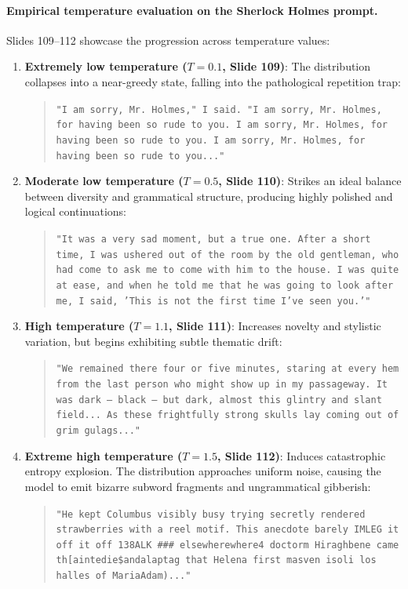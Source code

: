 \documentclass[../../main.tex]{subfiles}
\begin{document}
\paragraph{Empirical temperature evaluation on the Sherlock Holmes prompt.}
Slides 109--112 showcase the progression across temperature values:
\begin{enumerate}
    \item \textbf{Extremely low temperature ($T = 0.1$, Slide 109)}: The distribution collapses into a near-greedy state, falling into the pathological repetition trap:
    \begin{quote}
    \texttt{"I am sorry, Mr. Holmes," I said. "I am sorry, Mr. Holmes, for having been so rude to you. I am sorry, Mr. Holmes, for having been so rude to you. I am sorry, Mr. Holmes, for having been so rude to you..."}
    \end{quote}
    \item \textbf{Moderate low temperature ($T = 0.5$, Slide 110)}: Strikes an ideal balance between diversity and grammatical structure, producing highly polished and logical continuations:
    \begin{quote}
    \texttt{"It was a very sad moment, but a true one. After a short time, I was ushered out of the room by the old gentleman, who had come to ask me to come with him to the house. I was quite at ease, and when he told me that he was going to look after me, I said, 'This is not the first time I've seen you.'"}
    \end{quote}
    \item \textbf{High temperature ($T = 1.1$, Slide 111)}: Increases novelty and stylistic variation, but begins exhibiting subtle thematic drift:
    \begin{quote}
    \texttt{"We remained there four or five minutes, staring at every hem from the last person who might show up in my passageway. It was dark --- black --- but dark, almost this glintry and slant field... As these frightfully strong skulls lay coming out of grim gulags..."}
    \end{quote}
    \item \textbf{Extreme high temperature ($T = 1.5$, Slide 112)}: Induces catastrophic entropy explosion. The distribution approaches uniform noise, causing the model to emit bizarre subword fragments and ungrammatical gibberish:
    \begin{quote}
    \texttt{"He kept Columbus visibly busy trying secretly rendered strawberries with a reel motif. This anecdote barely IMLEG it off it off 138ALK \#\#\# elsewherewhere4 doctorm Hiraghbene came th[aintedie\$andalaptag that Helena first masven isoli los halles of MariaAdam)..."}
    \end{quote}
\end{enumerate}
\end{document}
